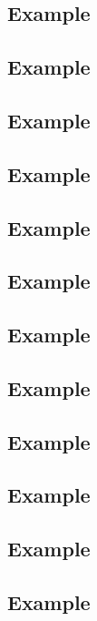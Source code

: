 \subsection*{\textbf{Example}}
\label{sec:24}

\subsection*{\textbf{Example}}
\label{sec:25}


\subsection*{\textbf{Example}}
\label{sec:26}

\subsection*{\textbf{Example}}
\label{sec:27}
\subsection*{\textbf{Example}}
\label{sec:28}
\subsection*{\textbf{Example}}
\label{sec:29}
\subsection*{\textbf{Example}}
\label{sec:30}
\subsection*{\textbf{Example}}
\label{sec:31}
\subsection*{\textbf{Example}}
\label{sec:32}
\subsection*{\textbf{Example}}
\label{sec:33}
\subsection*{\textbf{Example}}
\label{sec:34}
\subsection*{\textbf{Example}}
\label{sec:35}

